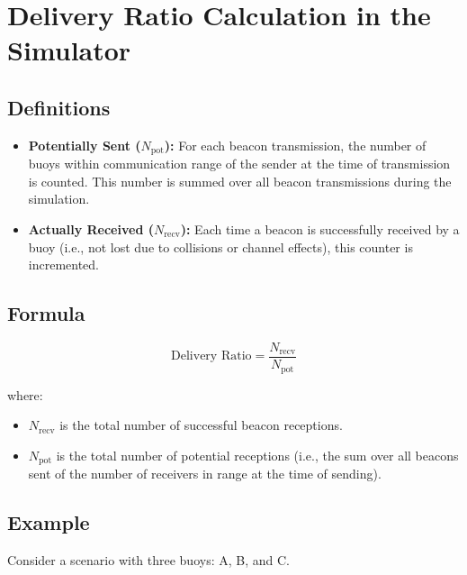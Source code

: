 \documentclass{article}
\begin{document}
\newpage


\section*{Delivery Ratio Calculation in the Simulator}

\subsection*{Definitions}

\begin{itemize}
    \item \textbf{Potentially Sent ($N_\text{pot}$):} For each beacon transmission, the number of buoys within communication range of the sender at the time of transmission is counted. This number is summed over all beacon transmissions during the simulation.
    \item \textbf{Actually Received ($N_\text{recv}$):} Each time a beacon is successfully received by a buoy (i.e., not lost due to collisions or channel effects), this counter is incremented.
\end{itemize}

\subsection*{Formula}

\[
\text{Delivery Ratio} = \frac{N_\text{recv}}{N_\text{pot}}
\]

where:
\begin{itemize}
    \item $N_\text{recv}$ is the total number of successful beacon receptions.
    \item $N_\text{pot}$ is the total number of potential receptions (i.e., the sum over all beacons sent of the number of receivers in range at the time of sending).
\end{itemize}

\subsection*{Example}

Consider a scenario with three buoys: A, B, and C.
\end{document}

